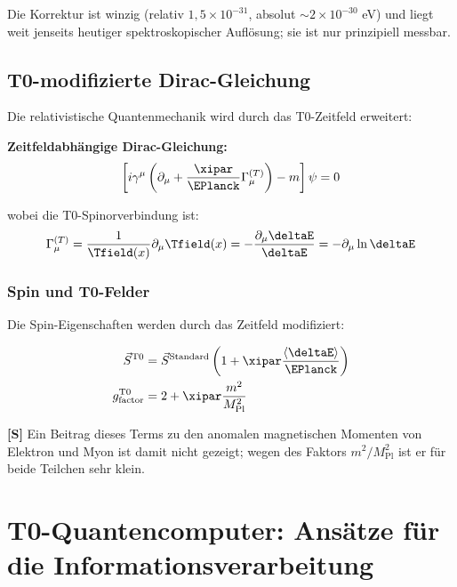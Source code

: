 	Die Korrektur ist winzig (relativ $1{,}5 \times 10^{-31}$, absolut $\sim 2 \times 10^{-30}$ eV) und liegt weit jenseits heutiger spektroskopischer Auflösung; sie ist nur prinzipiell messbar.
	
	\subsection{T0-modifizierte Dirac-Gleichung}
	
	Die relativistische Quantenmechanik wird durch das T0-Zeitfeld erweitert:
	
	\begin{tcolorbox}[colback=magenta!5!white,colframe=magenta!75!black,title=T0-Dirac-Gleichung]
		\textbf{Zeitfeldabhängige Dirac-Gleichung:}
		\begin{equation}
			\left[i\gamma^\mu \left(\partial_\mu + \frac{\xipar}{\EPlanck} \Gamma_\mu^{(T)}\right) - m\right]\psi = 0
		\end{equation}
		
		wobei die T0-Spinorverbindung ist:
		\begin{equation}
			\Gamma_\mu^{(T)} = \frac{1}{\Tfield(x)} \partial_\mu \Tfield(x) = -\frac{\partial_\mu \deltaE}{\deltaE} = -\partial_\mu \ln \deltaE
		\end{equation}
	\end{tcolorbox}
	
	\subsubsection{Spin und T0-Felder}
	
	Die Spin-Eigenschaften werden durch das Zeitfeld modifiziert:
	
	\begin{align}
		\vec{S}^{\text{T0}} &= \vec{S}^{\text{Standard}} \left(1 + \xipar \frac{\langle\deltaE\rangle}{\EPlanck}\right) \\
		g_{\text{factor}}^{\text{T0}} &= 2 + \xipar \frac{m^2}{M_{\text{Pl}}^2}
	\end{align}
	
	\textbf{[S]} Ein Beitrag dieses Terms zu den anomalen magnetischen Momenten von Elektron und Myon ist damit nicht gezeigt; wegen des Faktors $m^2/M_{\text{Pl}}^2$ ist er für beide Teilchen sehr klein.
	
	\section{T0-Quantencomputer: Ansätze für die Informationsverarbeitung}
	
